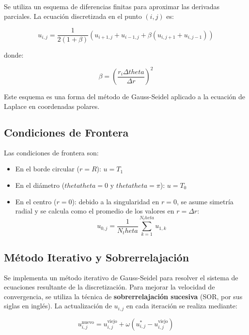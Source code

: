 Se utiliza un esquema de diferencias finitas para aproximar las derivadas parciales. La ecuación discretizada en el punto $(i, j)$ es:

\begin{equation} u_{i,j} = \frac{1}{2 (1 + \beta)} \left( u_{i+1,j} + u_{i-1,j} + \beta (u_{i,j+1} + u_{i,j-1}) \right) \end{equation}

donde:

\begin{equation} \beta = \left( \frac{r_i \Delta theta}{\Delta r} \right)^2 \end{equation}

Este esquema es una forma del método de Gauss-Seidel aplicado a la ecuación de Laplace en coordenadas polares.

\subsection{Condiciones de Frontera}

Las condiciones de frontera son:

\begin{itemize} \item En el borde circular ($r = R$): $u = T_1$ \item En el diámetro ($thetatheta = 0$ y $thetatheta = \pi$): $u = T_0$ \item En el centro ($r = 0$): debido a la singularidad en $r = 0$, se asume simetría radial y se calcula como el promedio de los valores en $r = \Delta r$: \begin{equation} u_{0,j} = \frac{1}{N_theta} \sum_{k=1}^{N_theta} u_{1,k} \end{equation} \end{itemize}

\subsection{Método Iterativo y Sobrerrelajación}

Se implementa un método iterativo de Gauss-Seidel para resolver el sistema de ecuaciones resultante de la discretización. Para mejorar la velocidad de convergencia, se utiliza la técnica de \textbf{sobrerrelajación sucesiva} (SOR, por sus siglas en inglés). La actualización de $u_{i,j}$ en cada iteración se realiza mediante:

\begin{equation} u_{i,j}^{\text{nuevo}} = u_{i,j}^{\text{viejo}} + \omega \left( u_{i,j}^{*} - u_{i,j}^{\text{viejo}} \right) \end{equation}


